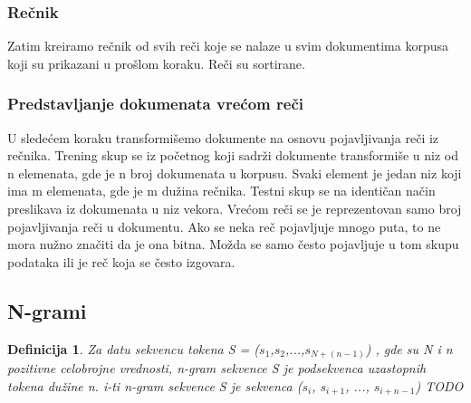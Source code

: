 \documentclass[12pt,oneside]{memoir}
\begin{document}
\subsubsection{Rečnik}
Zatim kreiramo rečnik od svih reči koje se nalaze u svim dokumentima korpusa koji su prikazani u prošlom koraku.  Reči su sortirane. 
\newline
\newline
\noindent{}
\newline
\subsubsection{Predstavljanje dokumenata vrećom reči}
U sledećem koraku transformišemo dokumente na osnovu pojavljivanja reči iz rečnika. 
\newline
\newline
\noindent{}
\newline
Trening skup se iz početnog koji sadrži dokumente transformiše u niz od n elemenata, gde je n broj dokumenata u korpusu.  Svaki element je jedan niz koji ima m elemenata, gde je m dužina rečnika.  Testni skup se na identičan način preslikava iz dokumenata u niz vekora.  
Vrećom reči se je reprezentovan samo broj pojavljivanja reči u dokumentu.  Ako se neka reč pojavljuje mnogo puta, to ne mora nužno značiti da je ona bitna.  Možda se samo često pojavljuje u tom skupu podataka ili je reč koja se često izgovara.

\subsection{N-grami}

\newtheorem{mydef}{Definicija}
\begin{mydef}
Za datu sekvencu tokena S = \normalfont($s_1$,$s_2$,...,$s_{N+(n-1)}$\normalfont) , gde su N i n pozitivne celobrojne vrednosti,  n-gram sekvence S je podsekvenca uzastopnih tokena dužine n.  i-ti n-gram sekvence S je sekvenca ($s_i$, $s_{i+1}$, ..., $s_{i+n-1}$) TODO
\end{mydef}
\end{document}
